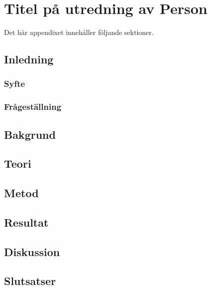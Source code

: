 \chapter{Titel på utredning av Person}
\label{cha:indiv-report-person}

Det här appendixet innehåller följande sektioner.

\section{Inledning}
\label{sec:introduction-person}


\subsection{Syfte}
\label{sec:purpose-person}


\subsection{Frågeställning}
\label{sec:issue-person}


\section{Bakgrund}
\label{sec:background-person}


\section{Teori}
\label{sec:theory-person}


\section{Metod}
\label{sec:method-person}


\section{Resultat}
\label{sec:results-person}


\section{Diskussion}
\label{sec:discussion-person}


\section{Slutsatser}
\label{sec:conclusions-person}


